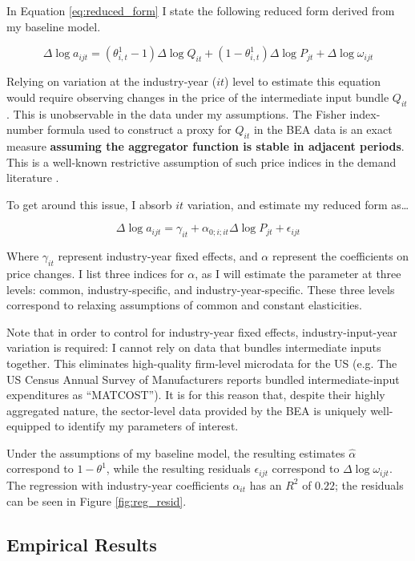\documentclass[11pt]{article}
\begin{document}
In Equation \ref{eq:reduced_form} I state the following reduced form derived from my baseline model.

\[
\Delta \log a_{ijt} = (\theta^1_{i,t} - 1) \Delta \log Q_{it} + (1-\theta^{1}_{i,t}) \Delta \log P_{jt} + \Delta \log \omega_{ijt}
\]

Relying on variation at the industry-year ($it$) level to estimate this equation would require observing changes in the price of the intermediate input bundle $Q_{it}$. This is unobservable in the data under my assumptions. The Fisher index-number formula used to construct a proxy for $Q_{it}$ in the BEA data is an exact measure \textbf{assuming the aggregator function is stable in adjacent periods}. This is a well-known restrictive assumption of such price indices in the demand literature \citep{reddingMeasuringAggregatePrice2020}. 

To get around this issue, I absorb $it$ variation, and estimate my reduced form as\dots 

\[
\Delta \log a_{ijt} = \gamma_{it} + \alpha_{0;i;it} \Delta \log P_{jt} + \epsilon_{ijt}
\]

Where $\gamma_{it}$ represent industry-year fixed effects, and $\alpha$ represent the coefficients on price changes. I list three indices for $\alpha$, as I will estimate the parameter at three levels: common, industry-specific, and industry-year-specific. These three levels correspond to relaxing assumptions of common and constant elasticities.

Note that in order to control for industry-year fixed effects, industry-input-year variation is required: I cannot rely on data that bundles intermediate inputs together. This eliminates high-quality firm-level microdata for the US (e.g. The US Census Annual Survey of Manufacturers reports bundled intermediate-input expenditures as ``MATCOST''). It is for this reason that, despite their highly aggregated nature, the sector-level data provided by the BEA is uniquely well-equipped to identify my parameters of interest. 

Under the assumptions of my baseline model, the resulting estimates $\hat{\alpha}$ correspond to $1-\theta^1$, while the resulting residuals $\epsilon_{ijt}$ correspond to $\Delta \log \omega_{ijt}$. The regression with industry-year coefficients $\alpha_{it}$ has an $R^2$ of $0.22$; the residuals can be seen in Figure \ref{fig:reg_resid}.

\subsection{Empirical Results}
\end{document}
